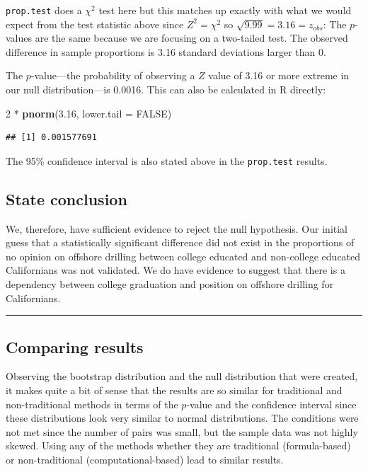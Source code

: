 \documentclass[]{tufte-book}
\newenvironment{Shaded}{\begin{snugshade}}{\end{snugshade}}
\newcommand{\KeywordTok}[1]{\textcolor[rgb]{0.13,0.29,0.53}{\textbf{{#1}}}}
\newcommand{\DataTypeTok}[1]{\textcolor[rgb]{0.13,0.29,0.53}{{#1}}}
\newcommand{\DecValTok}[1]{\textcolor[rgb]{0.00,0.00,0.81}{{#1}}}
\newcommand{\FloatTok}[1]{\textcolor[rgb]{0.00,0.00,0.81}{{#1}}}
\newcommand{\StringTok}[1]{\textcolor[rgb]{0.31,0.60,0.02}{{#1}}}
\newcommand{\OtherTok}[1]{\textcolor[rgb]{0.56,0.35,0.01}{{#1}}}
\newcommand{\NormalTok}[1]{{#1}}
\let\oldrule=\rule
\renewcommand{\rule}[1]{\oldrule{\linewidth}}
\begin{document}
\texttt{prop.test} does a \(\chi^2\) test here but this matches up
exactly with what we would expect from the test statistic above since
\(Z^2 = \chi^2\) so \(\sqrt{9.99} = 3.16 = z_{obs}\): The \(p\)-values
are the same because we are focusing on a two-tailed test. The observed
difference in sample proportions is 3.16 standard deviations larger than
0.

The \(p\)-value---the probability of observing a \(Z\) value of 3.16 or
more extreme in our null distribution---is 0.0016. This can also be
calculated in R directly:

\begin{Shaded}
\begin{Highlighting}[]
\DecValTok{2} \NormalTok{*}\StringTok{ }\KeywordTok{pnorm}\NormalTok{(}\FloatTok{3.16}\NormalTok{, }\DataTypeTok{lower.tail =} \OtherTok{FALSE}\NormalTok{)}
\end{Highlighting}
\end{Shaded}

\begin{verbatim}
## [1] 0.001577691
\end{verbatim}

The 95\% confidence interval is also stated above in the
\texttt{prop.test} results.

\subsection{State conclusion}\label{state-conclusion-2}

We, therefore, have sufficient evidence to reject the null hypothesis.
Our initial guess that a statistically significant difference did not
exist in the proportions of no opinion on offshore drilling between
college educated and non-college educated Californians was not
validated. We do have evidence to suggest that there is a dependency
between college graduation and position on offshore drilling for
Californians.

\begin{center}\rule{0.5\linewidth}{\linethickness}\end{center}

\subsection{Comparing results}\label{comparing-results-2}

Observing the bootstrap distribution and the null distribution that were
created, it makes quite a bit of sense that the results are so similar
for traditional and non-traditional methods in terms of the \(p\)-value
and the confidence interval since these distributions look very similar
to normal distributions. The conditions were not met since the number of
pairs was small, but the sample data was not highly skewed. Using any of
the methods whether they are traditional (formula-based) or
non-traditional (computational-based) lead to similar results.
\end{document}
